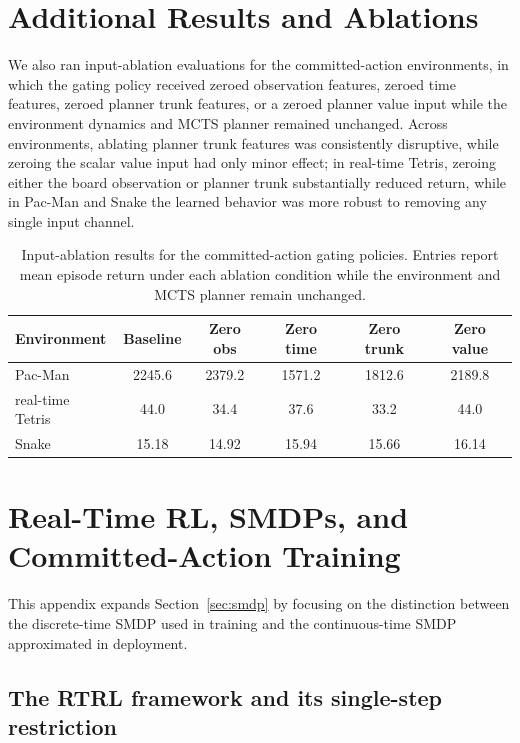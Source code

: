 \documentclass{article}
\begin{document}
\section{Additional Results and Ablations}
\label{app:ablations}

We also ran input-ablation evaluations for the committed-action environments, in
which the gating policy received zeroed observation features, zeroed time
features, zeroed planner trunk features, or a zeroed planner value input while
the environment dynamics and MCTS planner remained unchanged.
Across environments, ablating planner trunk features was consistently
disruptive, while zeroing the scalar value input had only minor effect; in
real-time Tetris, zeroing either the board observation or planner trunk substantially
reduced return, while in Pac-Man and Snake the learned behavior was more robust
to removing any single input channel.

\begin{table}[h]
  \centering
  \small
  \setlength{\tabcolsep}{6pt}
  \begin{tabular}{lccccc}
    \toprule
    Environment & Baseline & Zero obs & Zero time & Zero trunk & Zero value \\
    \midrule
    Pac-Man   & 2245.6 & 2379.2 & 1571.2 & 1812.6 & 2189.8 \\
    real-time Tetris &   44.0 &   34.4 &   37.6 &   33.2 &   44.0 \\
    Snake     &   15.18 &  14.92 &  15.94 &  15.66 &  16.14 \\
    \bottomrule
  \end{tabular}
  \caption{
    Input-ablation results for the committed-action gating policies.
    Entries report mean episode return under each ablation condition while the
    environment and MCTS planner remain unchanged.}
\end{table}


\section{Real-Time RL, SMDPs, and Committed-Action Training}
\label{app:rtrl_smdp}

This appendix expands Section~\ref{sec:smdp} by focusing on the distinction
between the discrete-time SMDP used in training and the continuous-time SMDP
approximated in deployment.

\subsection*{The RTRL framework and its single-step restriction}
\end{document}
